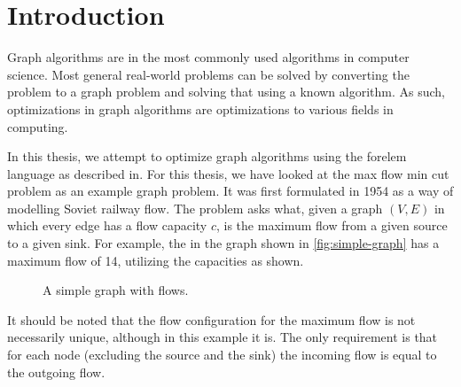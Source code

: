 \chapter{Introduction}

Graph algorithms are in the most commonly used algorithms in computer science. Most general real-world problems can be solved by converting the problem to a graph problem and solving that using a known algorithm. As such, optimizations in graph algorithms are optimizations to various fields in computing.

In this thesis, we attempt to optimize graph algorithms using the forelem language as described in\cite{AVersatileTupleBasedOptimizationFramework}. For this thesis, we have looked at the max flow min cut problem as an example graph problem. It was first formulated in 1954 as a way of modelling Soviet railway flow\cite{HarrisRoss}. The problem asks what, given a graph $(V,E)$ in which every edge has a flow capacity $c$, is the maximum flow from a given source to a given sink. For example, the in the graph shown in \autoref{fig:simple-graph} has a maximum flow of 14, utilizing the capacities as shown.

\begin{figure}[h]
\centering
{}
\caption{A simple graph with flows.}
\label{fig:simple-graph}
\end{figure}

It should be noted that the flow configuration for the maximum flow is not necessarily unique, although in this example it is. The only requirement is that for each node (excluding the source and the sink) the incoming flow is equal to the outgoing flow.


